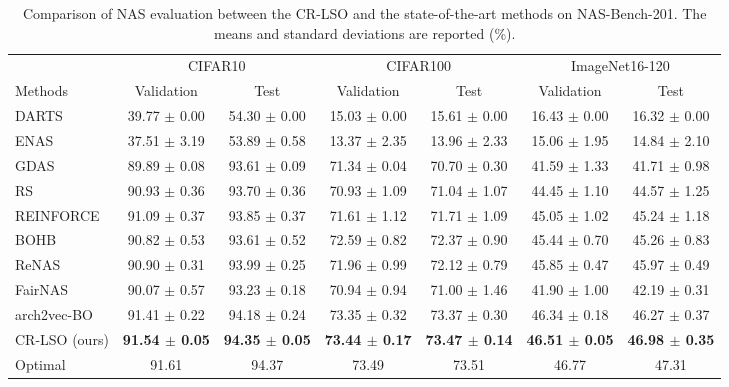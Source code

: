 \documentclass[10pt,twocolumn,letterpaper]{article}
\begin{document}
\begin{table*}[htbp]
	\centering
	\caption{Comparison of NAS evaluation between the CR-LSO and the state-of-the-art methods on NAS-Bench-201. The means and standard deviations are reported ($\%$). }
	\begin{tabular}{lcccccc}
		\toprule
		{} & \multicolumn{2}{c}{CIFAR10} & \multicolumn{2}{c}{CIFAR100} & \multicolumn{2}{c}{ImageNet16-120}   \\
		\cline{2-7} \specialrule{0em}{1.5pt}{2.0pt}
		Methods & Validation & Test & Validation & Test & Validation & Test  \\
		\midrule
		DARTS \cite{liu2018darts} & 39.77 $\pm$ 0.00 & 54.30 $\pm$ 0.00 & 15.03 $\pm$ 0.00 & 15.61 $\pm$ 0.00 & 16.43 $\pm$ 0.00 & 16.32 $\pm$ 0.00 \\
		ENAS \cite{DBLP:conf/icml/PhamGZLD18} & 37.51 $\pm$ 3.19 & 53.89 $\pm$ 0.58 & 13.37 $\pm$ 2.35 & 13.96 $\pm$ 2.33 & 15.06 $\pm$ 1.95 & 14.84 $\pm$ 2.10 \\
		GDAS \cite{DBLP:conf/cvpr/DongY19} & 89.89 $\pm$ 0.08 & 93.61 $\pm$ 0.09 & 71.34 $\pm$ 0.04 & 70.70 $\pm$ 0.30 & 41.59 $\pm$ 1.33 &  41.71 $\pm$ 0.98 \\
		RS \cite{bergstra2012random} & 90.93 $\pm$ 0.36 & 93.70 $\pm$ 0.36 & 70.93 $\pm$ 1.09 & 71.04 $\pm$ 1.07 & 44.45 $\pm$ 1.10 & 44.57 $\pm$ 1.25 \\
		REINFORCE \cite{williams1992simple} & 91.09 $\pm$ 0.37 & 93.85 $\pm$ 0.37 & 71.61 $\pm$ 1.12 & 71.71 $\pm$ 1.09 & 45.05 $\pm$ 1.02 & 45.24 $\pm$ 1.18 \\
		\midrule
		BOHB \cite{DBLP:conf/icml/FalknerKH18} & 90.82 $\pm$ 0.53 & 93.61 $\pm$ 0.52 & 72.59 $\pm$ 0.82 & 72.37 $\pm$ 0.90 & 45.44 $\pm$ 0.70 & 45.26 $\pm$ 0.83 \\
		ReNAS \cite{DBLP:conf/cvpr/Xu00TJX021} & 90.90 $\pm$ 0.31 & 93.99 $\pm$ 0.25 & 71.96 $\pm$ 0.99 & 72.12 $\pm$ 0.79 & 45.85 $\pm$ 0.47 & 45.97 $\pm$ 0.49 \\
		FairNAS \cite{DBLP:conf/iccv/Chu0X21} & 90.07 $\pm$ 0.57 & 93.23 $\pm$ 0.18 & 70.94 $\pm$ 0.94 & 71.00 $\pm$ 1.46 & 41.90 $\pm$ 1.00 & 42.19 $\pm$ 0.31 \\
		arch2vec-BO \cite{DBLP:conf/nips/YanZAZ020} & 91.41 $\pm$ 0.22 & 94.18 $\pm$ 0.24 & 73.35 $\pm$ 0.32 & 73.37 $\pm$ 0.30 & 46.34 $\pm$ 0.18 & 46.27 $\pm$ 0.37 \\
		CR-LSO (ours) & \textbf{91.54 $\pm$ 0.05} & \textbf{94.35 $\pm$ 0.05} & \textbf{73.44 $\pm$ 0.17} & \textbf{73.47 $\pm$ 0.14} & \textbf{46.51 $\pm$ 0.05} & \textbf{46.98 $\pm$ 0.35} \\
		\midrule
		Optimal & 91.61 & 94.37 & 73.49 & 73.51 & 46.77 & 47.31 \\
		\bottomrule
	\end{tabular}
	\label{tab:nas_bench_201}
\end{table*}
\end{document}
